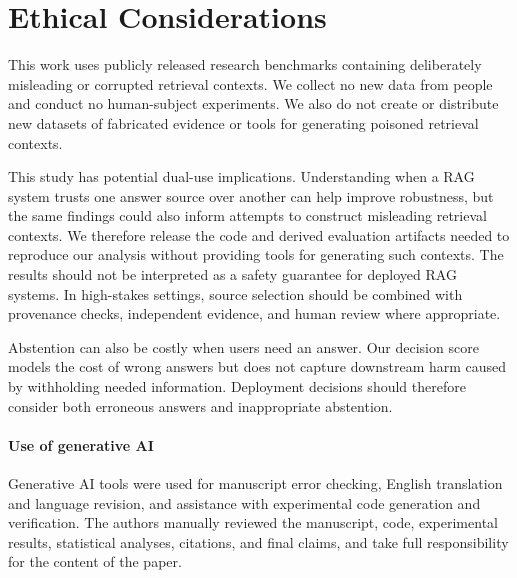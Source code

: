 \documentclass[sigconf]{acmart}
\begin{document}
\clearpage
\section*{Ethical Considerations}

This work uses publicly released research benchmarks containing
deliberately misleading or corrupted retrieval contexts. We collect no
new data from people and conduct no human-subject experiments. We also
do not create or distribute new datasets of fabricated evidence or
tools for generating poisoned retrieval contexts.

This study has potential dual-use implications. Understanding when a
RAG system trusts one answer source over another can help improve
robustness, but the same findings could also inform attempts to construct
misleading retrieval contexts. We therefore release the code and
derived evaluation artifacts needed to reproduce our analysis without
providing tools for generating such contexts. The results should not be
interpreted as a safety guarantee for deployed RAG systems. In
high-stakes settings, source selection should be combined with
provenance checks, independent evidence, and human review where
appropriate.

Abstention can also be costly when users need an answer. Our decision
score models the cost of wrong answers but does not capture downstream
harm caused by withholding needed information. Deployment decisions
should therefore consider both erroneous answers and inappropriate
abstention.

\paragraph{Use of generative AI}
Generative AI tools were used for manuscript error checking, English
translation and language revision, and assistance with experimental
code generation and verification. The authors manually reviewed the
manuscript, code, experimental results, statistical analyses, citations,
and final claims, and take full responsibility for the content of the
paper.



\end{document}
